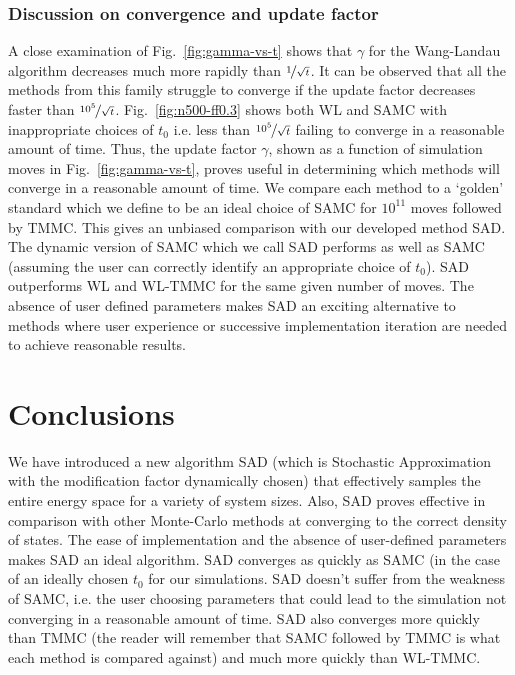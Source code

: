 \documentclass[letterpaper,twocolumn,amsmath,amssymb,pre,aps,10pt]{revtex4-1}
\begin{document}
\subsubsection{Discussion on convergence and update factor}

A close examination of Fig.~\ref{fig:gamma-vs-t} shows that $\gamma$
for the Wang-Landau algorithm decreases much more rapidly than
$\nicefrac{1}{\sqrt{t}}$. It can be observed that all the methods from
this family struggle to converge if the update factor decreases faster
than $\nicefrac{10^5}{\sqrt{t}}$. Fig.~\ref{fig:n500-ff0.3} shows both
WL and SAMC with inappropriate choices of $t_0$ i.e. less than
$\nicefrac{10^5}{\sqrt{t}}$ failing to converge in a reasonable amount
of time. Thus, the update factor $\gamma$, shown as a function of
simulation moves in Fig.~\ref{fig:gamma-vs-t}, proves useful in
determining which methods will converge in a reasonable amount of time.
We compare each method to a `golden' standard which we define to be an
ideal choice of SAMC for $10^{11}$ moves followed by TMMC.  This gives an
unbiased comparison with our developed method SAD. The dynamic version
of SAMC which we call SAD performs as well as SAMC (assuming the user
can correctly identify an appropriate choice of $t_0$).  SAD
outperforms WL and WL-TMMC for the same given number of moves. The
absence of user defined parameters makes SAD an exciting alternative to
methods where user experience or successive implementation iteration
are needed to achieve reasonable results.

\section{Conclusions}

We have introduced a new algorithm SAD (which is Stochastic Approximation
with the modification factor dynamically chosen) that effectively
samples the entire energy space for a variety of system sizes.  Also,
SAD proves effective in comparison with other Monte-Carlo methods at
converging to the correct density of states.  The ease of
implementation and the absence of user-defined parameters makes SAD an
ideal algorithm. SAD converges as quickly as SAMC (in the case of an ideally
chosen $t_0$ for our simulations. SAD doesn't suffer from the weakness of SAMC,
i.e. the user choosing parameters that could lead to the simulation not
converging in a reasonable amount of time. SAD also converges more quickly
than TMMC (the reader will remember that SAMC followed by TMMC is what each
method is compared against) and much more quickly than WL-TMMC.
\end{document}
